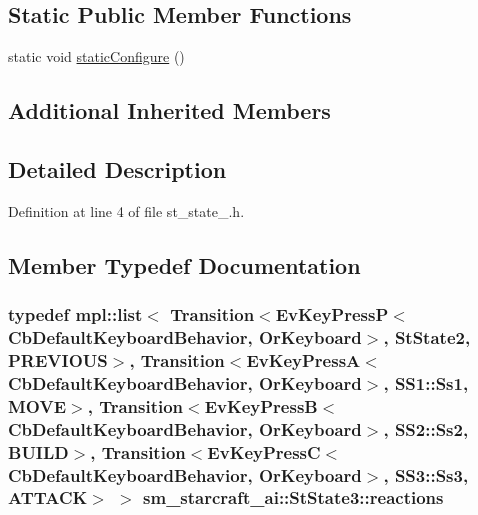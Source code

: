 \subsection*{Static Public Member Functions}
\begin{DoxyCompactItemize}
\item 
static void \hyperlink{structsm__starcraft__ai_1_1StState3_a7f4283b43a89eb40ed4af8ee7ba5438f}{static\+Configure} ()
\end{DoxyCompactItemize}
\subsection*{Additional Inherited Members}


\subsection{Detailed Description}


Definition at line 4 of file st\+\_\+state\+\_.\+h.



\subsection{Member Typedef Documentation}
\subsubsection[{\texorpdfstring{reactions}{reactions}}]{\setlength{\rightskip}{0pt plus 5cm}typedef mpl\+::list$<$ Transition$<$Ev\+Key\+PressP$<$Cb\+Default\+Keyboard\+Behavior, {\bf Or\+Keyboard}$>$, {\bf St\+State2}, {\bf P\+R\+E\+V\+I\+O\+US}$>$, Transition$<$Ev\+Key\+PressA$<$Cb\+Default\+Keyboard\+Behavior, {\bf Or\+Keyboard}$>$, {\bf S\+S1\+::\+Ss1}, {\bf M\+O\+VE}$>$, Transition$<$Ev\+Key\+PressB$<$Cb\+Default\+Keyboard\+Behavior, {\bf Or\+Keyboard}$>$, {\bf S\+S2\+::\+Ss2}, {\bf B\+U\+I\+LD}$>$, Transition$<$Ev\+Key\+PressC$<$Cb\+Default\+Keyboard\+Behavior, {\bf Or\+Keyboard}$>$, {\bf S\+S3\+::\+Ss3}, {\bf A\+T\+T\+A\+CK}$>$ $>$ {\bf sm\+\_\+starcraft\+\_\+ai\+::\+St\+State3\+::reactions}}\hypertarget{structsm__starcraft__ai_1_1StState3_a873f77574cc9558f4ec06c2c34040c85}{}\label{structsm__starcraft__ai_1_1StState3_a873f77574cc9558f4ec06c2c34040c85}


